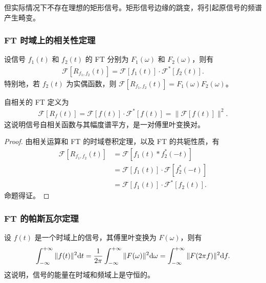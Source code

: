 \begin{remark}
    但实际情况下不存在理想的矩形信号。矩形信号边缘的跳变，将引起原信号的频谱产生畸变。
\end{remark}

\subsubsection{FT 时域上的相关性定理}

\begin{theorem}
    设信号 $f_1(t)$ 和 $f_2(t)$ 的 FT 分别为 $F_1(\omega)$ 和 $F_2(\omega)$，则有
    \begin{align*}
        \mathcal{F}[R_{f_1, f_2}(t)] = \mathcal{F}[f_1(t)] \cdot \mathcal{F}^*[f_2(t)].
    \end{align*}
    特别地，若 $f_2(t)$ 为实偶函数，则 $\mathcal{F}[R_{f_1, f_2}(t)] = F_1(\omega)F_2(\omega)$。

    自相关的 FT 定义为
    \begin{align*}
        \mathcal{F}[R_f(t)] = \mathcal{F}[f(t)] \cdot \mathcal{F}^*[f(t)] = \|\mathcal{F}[f(t)]\|^2.
    \end{align*}
    这说明信号自相关函数与其幅度谱平方，是一对傅里叶变换对。
\end{theorem}

\begin{proof}
    由相关运算和 FT 的时域卷积定理，以及 FT 的共轭性质，有
    \begin{align*}
        \mathcal{F}[R_{f_1, f_2}(t)] & = \mathcal{F}[f_1(t) * f_2^*(-t)] \\
        & = \mathcal{F}[f_1(t)] \cdot \mathcal{F}[f_2^*(-t)] \\
        & = \mathcal{F}[f_1(t)] \cdot \mathcal{F}^*[f_2(t)].
    \end{align*}
    命题得证。
\end{proof}

\subsubsection{FT 的帕斯瓦尔定理}

\begin{theorem}
    设 $f(t)$ 是一个时域上的信号，其傅里叶变换为 $F(\omega)$，则有
    \begin{align*}
        \int_{-\infty}^{+\infty} \|f(t)\|^2 \mathrm{d}t
        = \frac{1}{2\pi}\int_{-\infty}^{+\infty} \|F(\omega)\|^2 \mathrm{d}\omega
        = \int_{-\infty}^{+\infty}\|F(2\pi f)\|^2 \mathrm{d}f.
    \end{align*}
    这说明，信号的能量在时域和频域上是守恒的。
\end{theorem}
